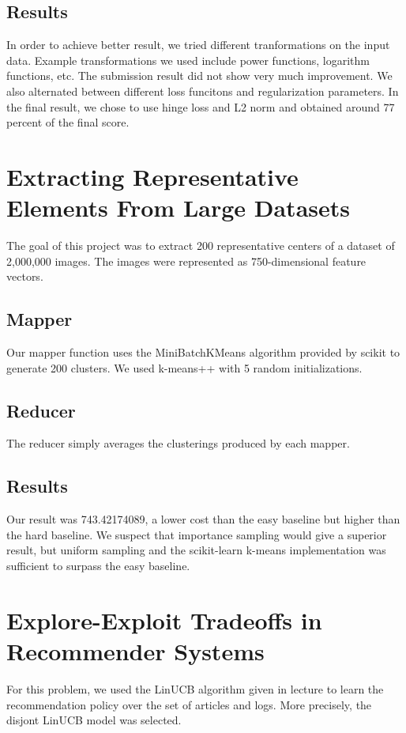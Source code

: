 \documentclass[a4paper, 11pt]{article}
\begin{document}
\subsection{Results}
In order to achieve better result, we tried different tranformations on the input data. Example transformations we used include power functions, logarithm functions, etc. The submission result did not show very much improvement. We also alternated between different loss funcitons and regularization parameters. In the final result, we chose to use hinge loss and L2 norm and obtained around 77 percent of the final score.

\newpage

\section{Extracting Representative Elements From Large Datasets}

The goal of this project was to extract 200 representative centers of a dataset of 2,000,000 images. The images were represented as 750-dimensional feature vectors.

\subsection{Mapper}
Our mapper function uses the MiniBatchKMeans algorithm provided by scikit to generate 200 clusters. We used k-means++ with 5 random initializations.

\subsection{Reducer}
The reducer simply averages the clusterings produced by each mapper.

\subsection{Results}

Our result was 743.42174089, a lower cost than the easy baseline but higher than the hard baseline. We suspect that importance sampling would give a superior result, but uniform sampling and the scikit-learn k-means implementation was sufficient to surpass the easy baseline.

\newpage

\section{Explore-Exploit Tradeoffs in Recommender Systems}
For this problem, we used the LinUCB algorithm given in lecture to learn the recommendation policy over the set of articles and logs. More precisely, the disjont LinUCB model was selected.
\end{document}
